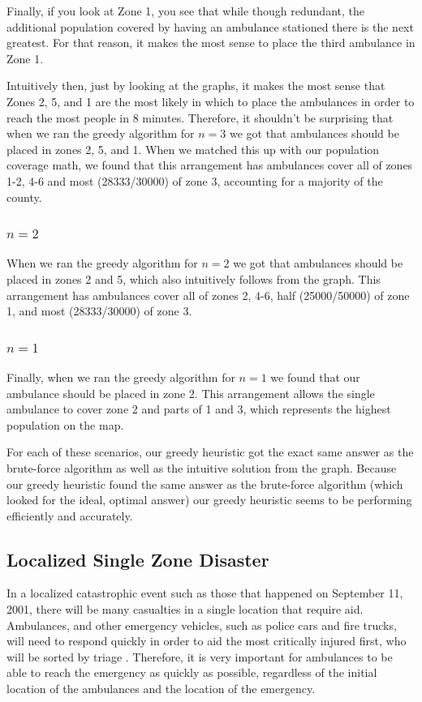 \documentclass[notitlepage, 12pt]{article}
\begin{document}
Finally, if you look at Zone 1, you see that while though redundant, the additional population covered by having an ambulance stationed there is the next greatest. For that reason, it makes the most sense to place the third ambulance in Zone 1.

Intuitively then, just by looking at the graphs, it makes the most sense that Zones 2, 5, and 1 are the most likely in which to place the ambulances in order to reach the most people in 8 minutes. Therefore, it shouldn't be surprising that when we ran the greedy algorithm for $n=3$ we got that ambulances should be placed in zones
2, 5, and 1. When we matched this up with our population coverage math, we found that this arrangement has ambulances cover all of zones 1-2, 4-6 and most (28333/30000) of zone 3, accounting for a majority of the county.

\subsubsection{$n=2$}
When we ran the greedy algorithm for $n=2$ we got that ambulances should be placed in zones
2 and 5, which also intuitively follows from the graph. This arrangement has ambulances cover all of zones 2, 4-6, half (25000/50000) of zone 1, and most (28333/30000) of zone 3.

\subsubsection{$n=1$}
Finally, when we ran the greedy algorithm for $n=1$ we found that our ambulance should be placed in zone 2. This arrangement allows the single ambulance to cover zone 2 and parts of 1 and 3, which represents the highest population on the map.

For each of these scenarios, our greedy heuristic got the exact same answer as the
brute-force algorithm as well as the intuitive solution from the graph. Because our greedy heuristic found the same answer as the brute-force algorithm (which looked for the ideal, optimal answer) our greedy heuristic seems to be performing efficiently and accurately.

\subsection{Localized Single Zone Disaster}
In a localized catastrophic event such as those that happened on September 11, 2001, there will be
many casualties in a single location that require aid. Ambulances, and other emergency vehicles,
such as police cars and fire trucks, will need to respond quickly in order to aid the most critically
injured first, who will be sorted by triage \cite{ColRev}. Therefore, it is very important for ambulances to be able to
reach the emergency as quickly as possible, regardless of the initial location of the ambulances and the
location of the emergency.
\end{document}

